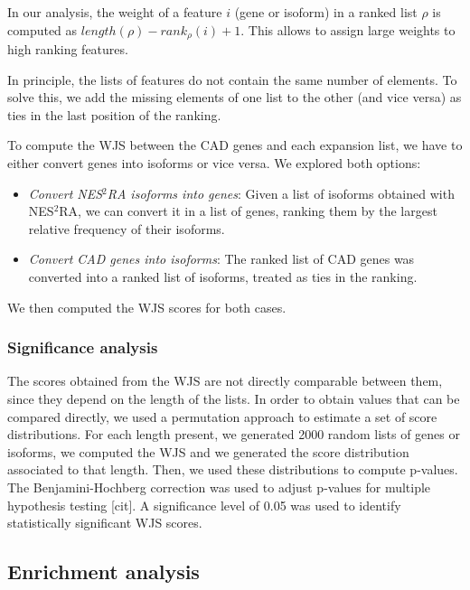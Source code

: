 \documentclass[fleqn,10pt]{SelfArx} %
\begin{document}
In our analysis, the weight of a feature $i$ (gene or isoform) in a ranked list $\rho$ is computed as $length(\rho) - rank_{\rho}(i) + 1$. This allows to assign large weights to high ranking features.

In principle, the lists of features do not contain the same number of elements. To solve this, we add the missing elements of one list to the other (and vice versa) as ties in the last position of the ranking.

To compute the WJS between the CAD genes and each expansion list, we have to either convert genes into isoforms or vice versa. We explored both options:

\begin{itemize}[leftmargin=*]
	\item \textit{Convert NES$^2$RA isoforms into genes}: Given a list of isoforms obtained with NES$^2$RA, we can convert it in a list of genes, ranking them by the largest relative frequency of their isoforms.
	\item \textit{Convert CAD genes into isoforms}: The ranked list of CAD genes was converted into a ranked list of isoforms, treated as ties in the ranking.
\end{itemize}

We then computed the WJS scores for both cases.

\subsubsection*{Significance analysis} 

The scores obtained from the WJS are not directly comparable between them, since they depend on the length of the lists. In order to obtain values that can be compared directly, we used a permutation approach to estimate a set of score distributions. For each length present, we generated 2000 random lists of genes or isoforms, we computed the WJS and we generated the score distribution associated to that length. Then, we used these distributions to compute p-values. The Benjamini-Hochberg correction was used to adjust p-values for multiple hypothesis testing [cit]. A significance level of 0.05 was used to identify statistically significant WJS scores. 

\subsection*{Enrichment analysis}
\end{document}
